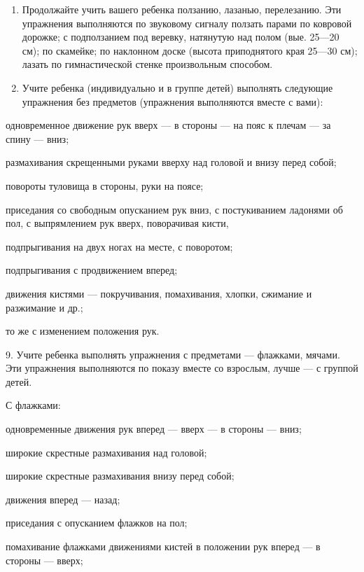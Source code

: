 \documentclass[a5paper]{book}
\begin{document}
\begin{enumerate}
\def\labelenumi{\arabic{enumi}.}
\setcounter{enumi}{6}
\item
  
  Продолжайте учить вашего ребенка ползанию, лазанью, перелезанию. Эти
  упражнения выполняются по звуковому сигналу ползать парами по ковровой
  дорожке; с подползанием под веревку, натянутую над полом (вые. 25---20
  см); по скамейке; по наклонном доске (высота приподнятого края 25---30
  см); лазать по гимнастической стенке произвольным способом.
  
\item
  
  Учите ребенка (индивидуально и в группе детей) выполнять следующие
  упражнения без предметов (упражнения выполняются вместе с вами):
  
\end{enumerate}


одновременное движение рук вверх --- в стороны --- на пояс к плечам ---
за спину --- вниз;

размахивания скрещенными руками вверху над головой и внизу перед собой;

повороты туловища в стороны, руки на поясе;

приседания со свободным опусканием рук вниз, с постукиванием ладонями об
пол, с выпрямлением рук вверх, поворачивая кисти,

подпрыгивания на двух ногах на месте, с поворотом;

подпрыгивания с продвижением вперед;

движения кистями --- покручивания, помахивания, хлопки, сжимание и
разжимание и др.;

то же с изменением положения рук.

9. Учите ребенка выполнять упражнения с предметами --- флажками, мячами.
Эти упражнения выполняются по показу вместе со взрослым, лучше --- с
группой детей.

С флажками:

одновременные движения рук вперед --- вверх --- в стороны --- вниз;

широкие скрестные размахивания над головой;

широкие скрестные размахивания внизу перед собой;

движения вперед --- назад;

приседания с опусканием флажков на пол;

помахивание флажками движениями кистей в положении рук вперед --- в
стороны --- вверх;
\end{document}
